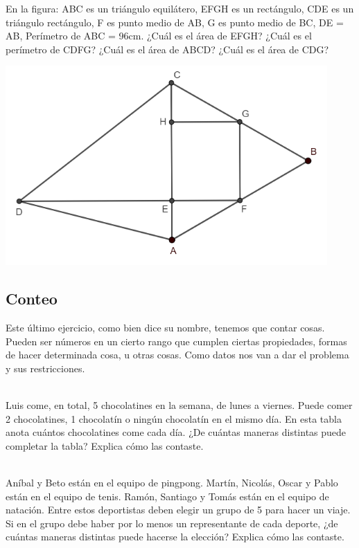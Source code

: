 \documentclass{article}
\begin{document}
\begin{ejemplo}
En la figura:
ABC es un triángulo equilátero,
EFGH es un rectángulo,
CDE es un triángulo rectángulo,
F es punto medio de AB,
G es punto medio de BC,
DE = AB,
Perímetro de ABC = 96cm.
¿Cuál es el área de EFGH?
¿Cuál es el perímetro de CDFG?
¿Cuál es el área de ABCD?
¿Cuál es el área de CDG?

\includegraphics[scale=0.6]{geometry-example-2}
\end{ejemplo}

\subsection{Conteo}
\begin{normalsize}
Este último ejercicio, como bien dice su nombre, tenemos que contar cosas. Pueden ser números en un cierto rango que cumplen ciertas propiedades, formas de hacer determinada cosa, u otras cosas. Como datos nos van a dar el problema y sus restricciones.
\\
\\
\end{normalsize}

\begin{ejemplo}
Luis come, en total, 5 chocolatines en la semana, de lunes a viernes.
Puede comer 2 chocolatines, 1 chocolatín o ningún chocolatín en el mismo día.
En esta tabla anota cuántos chocolatines come cada día.
¿De cuántas maneras distintas puede completar la tabla?
Explica cómo las contaste.
\\
\\
\end{ejemplo}

\begin{ejemplo}
Aníbal y Beto están en el equipo de pingpong.
Martín, Nicolás, Oscar y Pablo están en el equipo de tenis.
Ramón, Santiago y Tomás están en el equipo de natación.
Entre estos deportistas deben elegir un grupo de 5 para hacer un viaje.
Si en el grupo debe haber por lo menos un representante de cada deporte,
¿de cuántas maneras distintas puede hacerse la elección?
Explica cómo las contaste.

\end{ejemplo}
\end{document}
